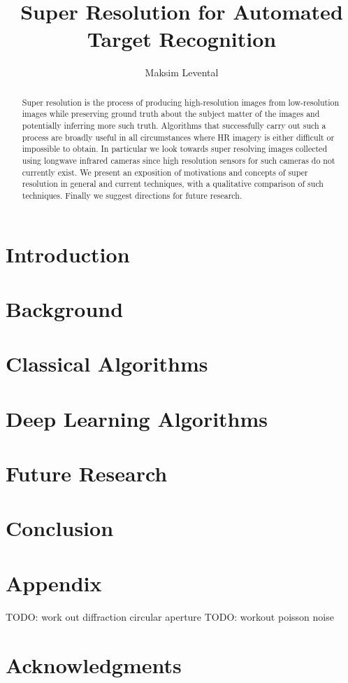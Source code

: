 \documentclass[journal]{IEEEtran}
\begin{document}
    \title{Super Resolution for Automated Target Recognition}
    \author{Maksim Levental}
    \maketitle

    \begin{abstract}
        Super resolution is the process of producing high-resolution images from low-resolution images while preserving ground truth about the subject matter of the images and potentially inferring more such truth.
        Algorithms that successfully carry out such a process are broadly useful in all circumstances where HR imagery is either difficult or impossible to obtain.
        In particular we look towards super resolving images collected using longwave infrared cameras since high resolution sensors for such cameras do not currently exist.
        We present an exposition of motivations and concepts of super resolution in general and current techniques, with a qualitative comparison of such techniques.
        Finally we suggest directions for future research.
    \end{abstract}

    \section{Introduction}\label{sec:introduction}
    

    \section{Background}\label{sec:background}
    

    \section{Classical Algorithms}\label{sec:classical-algorithms}
    \section{Deep Learning Algorithms}\label{sec:deep-learning-algorithms}
    \section{Future Research}\label{sec:future-research}
    \section{Conclusion}\label{sec:conclusion}
    \section{Appendix}\label{sec:appendix}
    TODO: work out diffraction circular aperture
    TODO: workout poisson noise
    \section*{Acknowledgments}
    \newpage
    \printbibliography
\end{document}
